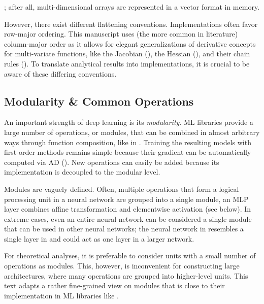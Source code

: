 %
; after all, multi-dimensional arrays are represented in a vector format in
memory.

However, there exist different flattening conventions. Implementations often
favor row-major ordering. This manuscript uses (the more common in literature)
column-major order as it allows for elegant generalizations of derivative
concepts for multi-variate functions, like the Jacobian
(), the Hessian
(), and their chain rules
(). To translate
analytical results into implementations, it is crucial to be aware of these
differing conventions.

\subsection{Modularity \& Common
  Operations}\label{sec:background::CommonOperations}

An important strength of deep learning is its \emph{modularity}. ML libraries
provide a large number of operations, or modules, that can be combined in almost
arbitrary ways through function composition, like in
. Training the resulting models with
first-order methods remains simple because their gradient can be automatically
computed via AD (). New operations
can easily be added because its implementation is decoupled to the modular
level.

Modules are vaguely defined. Often, multiple operations that form a logical
processing unit in a neural network are grouped into a single module, \eg an MLP
layer combines affine transformation and elementwise activation (see below). In
extreme cases, even an entire neural network can be considered a single module
that can be used in other neural networks; \eg the neural network in
 resembles a single layer in
 and could act as one layer in a larger
network.

For theoretical analyses, it is preferable to consider units with a small number
of operations as modules. This, however, is inconvenient for constructing large
architectures, where many operations are grouped into higher-level units. This
text adapts a rather fine-grained view on modules that is close to their
implementation in ML libraries like \pytorch.

